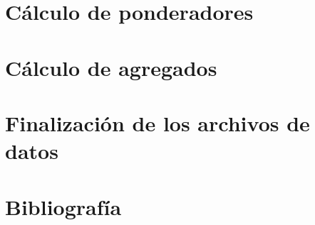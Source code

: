 \documentclass[
]{article}
\begin{document}
\newpage

\hypertarget{cuxe1lculo-de-ponderadores}{%
\section{Cálculo de ponderadores}\label{cuxe1lculo-de-ponderadores}}

\newpage

\hypertarget{cuxe1lculo-de-agregados}{%
\section{Cálculo de agregados}\label{cuxe1lculo-de-agregados}}

\newpage

\hypertarget{finalizaciuxf3n-de-los-archivos-de-datos}{%
\section{Finalización de los archivos de datos}\label{finalizaciuxf3n-de-los-archivos-de-datos}}

\newpage

\hypertarget{bibliografuxeda}{%
\section{Bibliografía}\label{bibliografuxeda}}
\end{document}
